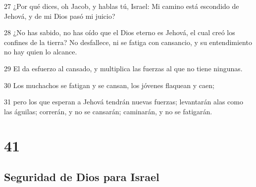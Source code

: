 \par 27 ¿Por qué dices, oh Jacob, y hablas tú, Israel: Mi camino está escondido de Jehová, y de mi Dios pasó mi juicio?
\par 28 ¿No has sabido, no has oído que el Dios eterno es Jehová, el cual creó los confines de la tierra? No desfallece, ni se fatiga con cansancio, y su entendimiento no hay quien lo alcance.
\par 29 El da esfuerzo al cansado, y multiplica las fuerzas al que no tiene ningunas.
\par 30 Los muchachos se fatigan y se cansan, los jóvenes flaquean y caen;
\par 31 pero los que esperan a Jehová tendrán nuevas fuerzas; levantarán alas como las águilas; correrán, y no se cansarán; caminarán, y no se fatigarán.

\chapter{41}

\section*{Seguridad de Dios para Israel}

